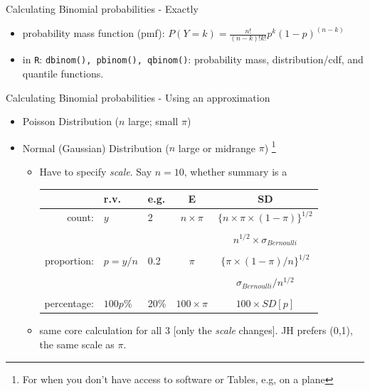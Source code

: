 \documentclass[handout]{beamer}\usepackage[]{graphicx}\usepackage[]{color}
\begin{document}
\begin{frame}{Calculating Binomial probabilities - Exactly}



\begin{itemize}
	\item  probability mass function (pmf): $P(Y=k) =
	\frac{n!}{(n-k)!k!}p^k(1-p)^{(n-k)}$
	\item in \texttt{R}: \texttt{dbinom(), pbinom(), qbinom()}: \newline probability mass, distribution/cdf, and quantile functions.
\end{itemize}

\end{frame}




\begin{frame}{Calculating Binomial probabilities - Using an approximation}

\small
\begin{itemize}
	\item Poisson Distribution ($n$ large;  small $\pi$)
	\item Normal (Gaussian) Distribution ($n$ large or midrange $\pi $) \footnote{\footnotesize
		For when you don't have access to software or Tables, e.g, on a plane} 
	\begin{itemize}
		\item Have to specify \textit{scale}. Say $n=10$, whether summary is a 
		\begin{tabular}{rllcc}
			&  \textbf{r.v. }        &  \textbf{e.g.} & \textbf{E} & \textbf{SD} \\ 
			\hline
			count:          &  $y$        &  2 & $n \times \pi$ & $\{n \times \pi \times (1-\pi) \}^{1/2}$ \\
			& & & & \\
			& & & & $n^{1/2} \times \sigma_{Bernoulli}$ \\
			
			& & & & \\
			proportion:   & $p=y/n$  & 0.2 & $ \pi$ & $\{\pi \times (1-\pi) / n \}^{1/2}$ \\
			& & & & \\
			
			& & & &  $\sigma_{Bernoulli} / n^{1/2}$\\
			
			& & & & \\
			percentage: &$100p\%$ & 20\% & $100 \times \pi$ & $100 \times SD[p]$ \\
			\hline
		\end{tabular}
		\item same core calculation for all 3 [only the \textit{scale} changes]. JH prefers (0,1), the same scale as $\pi.$
		
	\end{itemize}
	
\end{itemize}

\end{frame}
\end{document}
